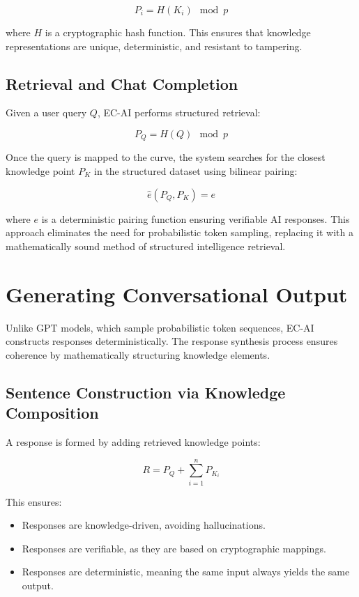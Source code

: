\documentclass{article}
\begin{document}
\begin{equation}
P_i = H(K_i) \mod p
\end{equation}

where $H$ is a cryptographic hash function. This ensures that knowledge representations are unique, deterministic, and resistant to tampering.

\subsection{Retrieval and Chat Completion}

Given a user query $Q$, EC-AI performs structured retrieval:

\begin{equation}
P_Q = H(Q) \mod p
\end{equation}

Once the query is mapped to the curve, the system searches for the closest knowledge point $P_K$ in the structured dataset using bilinear pairing:

\begin{equation}
\hat{e}(P_Q, P_K) = e
\end{equation}

where $e$ is a deterministic pairing function ensuring verifiable AI responses.
This approach eliminates the need for probabilistic token sampling, replacing it with a mathematically sound method of structured intelligence retrieval.

\section{Generating Conversational Output}

Unlike GPT models, which sample probabilistic token sequences, EC-AI constructs responses deterministically. 
The response synthesis process ensures coherence by mathematically structuring knowledge elements.

\subsection{Sentence Construction via Knowledge Composition}
A response is formed by adding retrieved knowledge points:

\begin{equation}
R = P_Q + \sum_{i=1}^{n} P_{K_i}
\end{equation}

This ensures:
\begin{itemize}
    \item Responses are knowledge-driven, avoiding hallucinations.
    \item Responses are verifiable, as they are based on cryptographic mappings.
    \item Responses are deterministic, meaning the same input always yields the same output.
\end{itemize}
\end{document}
